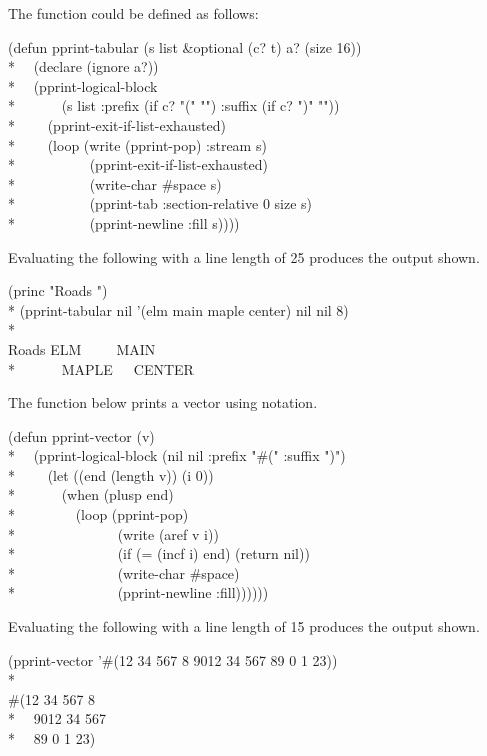 The function  could be defined as follows:
\begin{lisp}
(defun pprint-tabular (s list \&optional (c? t) a? (size 16)) \\*
~~(declare (ignore a?)) \\*
~~(pprint-logical-block \\*
~~~~~~(s list :prefix (if c? "(" "") :suffix (if c? ")" "")) \\*
~~~~(pprint-exit-if-list-exhausted) \\*
~~~~(loop (write (pprint-pop) :stream s) \\*
~~~~~~~~~~(pprint-exit-if-list-exhausted) \\*
~~~~~~~~~~(write-char \#{\Xbackslash}space s) \\*
~~~~~~~~~~(pprint-tab :section-relative 0 size s) \\*
~~~~~~~~~~(pprint-newline :fill s))))
\end{lisp}

Evaluating the following with a line length of 25 produces the output shown.
\begin{lisp}
(princ "Roads ") \\*
(pprint-tabular nil '(elm main maple center) nil nil 8) \\*
\\
Roads ELM~~~~~MAIN \\*
~~~~~~MAPLE~~~CENTER
\end{lisp}

The function below prints a vector using  notation.
\begin{lisp}
(defun pprint-vector (v) \\*
~~(pprint-logical-block (nil nil :prefix "\#(" :suffix ")") \\*
~~~~(let ((end (length v)) (i 0)) \\*
~~~~~~(when (plusp end) \\*
~~~~~~~~(loop (pprint-pop) \\*
~~~~~~~~~~~~~~(write (aref v i)) \\*
~~~~~~~~~~~~~~(if (= (incf i) end) (return nil)) \\*
~~~~~~~~~~~~~~(write-char \#{\Xbackslash}space) \\*
~~~~~~~~~~~~~~(pprint-newline :fill))))))
\end{lisp}

Evaluating the following with a line length of 15 produces the output shown.
\begin{lisp}
(pprint-vector '\#(12 34 567 8 9012 34 567 89 0 1 23)) \\*
\\
\#(12 34 567 8  \\*
~~9012 34 567  \\*
~~89 0 1 23)
\end{lisp}


